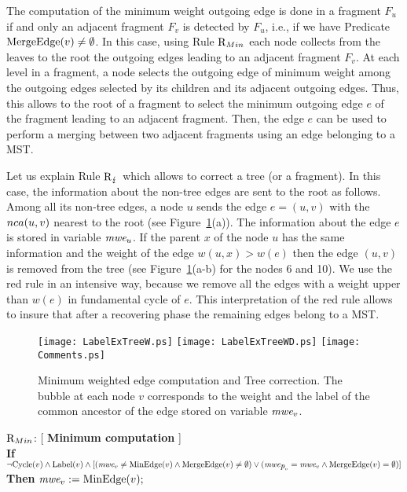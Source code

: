 \documentclass[11pt,a4paper]{article}
\newcommand{\parent}{\mbox{\it p}}
\newcommand{\m}{\mbox{\it mwe}}
\newcommand{\Cycle}{\mbox{\rm Cycle}}
\newcommand{\Label}{\mbox{\rm Label}}
\newcommand{\MinEdge}{\mbox{\rm MinEdge}}
\newcommand{\Lca}{\mbox{\rm $nca$}}
\newcommand{\Fusion}{\mbox{\rm MergeEdge}}
\newcommand{\RC}{\mbox{\rm R$_{\lightning}$}} \newcommand{\RReo}{\mbox{\rm R$_{\downarrow}$}}
\begin{document}
The computation of the minimum weight outgoing edge is done in a fragment $F_u$ if and only an adjacent fragment $F_v$ is detected by $F_u$, i.e., if we have Predicate $\Fusion(v) \neq \emptyset$. In this case, using Rule $\mbox{\rm R$_{Min}$}$ each node collects from the leaves to the root the outgoing edges leading to an adjacent fragment $F_v$. At each level in a fragment, a node selects the outgoing edge of minimum weight among the outgoing edges selected by its children and its adjacent outgoing edges. Thus, this allows to the root of a fragment to select the minimum outgoing edge $e$ of the fragment leading to an adjacent fragment. Then, the edge $e$ can be used to perform a merging between two adjacent fragments using an edge belonging to a MST.



Let us explain Rule $\RC$ which allows to correct a tree (or a fragment). 
In this case, the information about the non-tree edges are sent to the
root as follows. 
Among all its non-tree edges, a node $u$ sends the edge $e=(u,v)$ with the $\Lca(u,v)$ nearest to the root (see Figure~\ref{fig:min}(a)).
The information about the edge $e$ is stored in variable $\m_u$.
If the parent $x$ of the node $u$ has the same information and  the
weight of the edge $w(u,x)>w(e)$ then 
the edge $(u,v)$ is removed from the tree (see Figure~\ref{fig:min}(a-b) for the nodes 6 and 10).
We use the red rule in an intensive way, because we remove all the edges with a weight upper than $w(e)$ in fundamental cycle of $e$. 
This interpretation of the red rule allows to insure that after a recovering phase the remaining edges belong to a MST.

\begin{figure}[htbp]
\begin{center}
\texttt{[image: LabelExTreeW.ps]}
\texttt{[image: LabelExTreeWD.ps]}
\texttt{[image: Comments.ps]}
\caption{Minimum weighted edge computation and Tree correction. The bubble at each node $v$ corresponds to the weight and the label of the common ancestor of the edge stored on variable $\m_v$.}
\label{fig:min}
\end{center}
\end{figure}





\begin{description}
\item $\mbox{\rm R$_{Min}$}$: [ \textbf{Minimum computation} ] \\
\textbf{If} $\neg \Cycle(v) \wedge \Label(v)  \wedge [(\m_v \neq \MinEdge(v) \wedge \Fusion(v)\neq \emptyset) \vee (\m_{\parent_v}=\m_v \wedge \Fusion(v)=\emptyset)]$\\
\textbf{Then } $\m_v:=\MinEdge(v);$
\end{description}
\end{document}
